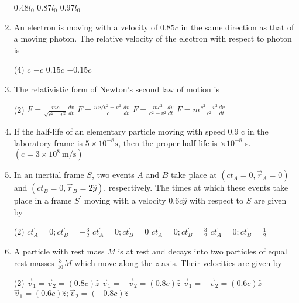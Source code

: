 \begin{enumerate}
\begin{tasks}
	\task[\textbf{B.}]$0.48 l_{0}$
	\task[\textbf{C.}]$0.87 l_{0}$
	\task[\textbf{D.}]$0.97 l_{0}$
\end{tasks}
	\item An electron is moving with a velocity of $0.85 c$ in the same direction as that of a moving photon. The relative velocity of the electron with respect to photon is
	{}
\begin{tasks}(4)
	\task[\textbf{A.}] $c$
	\task[\textbf{B.}]$-c$
	\task[\textbf{C.}] $0.15 c$
	\task[\textbf{D.}]$-0.15 c$
\end{tasks}
	\item  The relativistic form of Newton's second law of motion is 
	{}
\begin{tasks}(2)
	\task[\textbf{A.}] $F=\frac{m c}{\sqrt{c^{2}-v^{2}}} \frac{d v}{d t}$ 
	\task[\textbf{B.}]$F=\frac{m \sqrt{c^{2}-v^{2}}}{c} \frac{d v}{d t}$
	\task[\textbf{C.}]$F=\frac{m c^{2}}{c^{2}-v^{2}} \frac{d v}{d t}$
	\task[\textbf{D.}]$F=m \frac{c^{2}-v^{2}}{c^{2}} \frac{d v}{d t}$
\end{tasks}

	\item If the half-life of an elementary particle moving with speed $0.9$ c in the laboratory frame is $5 \times 10^{-8} s$, then the proper half-life is $\times 10^{-8}$ s. $\left(c=3 \times 10^{8} \mathrm{~m} / \mathrm{s}\right)$
	{}
	\item In an inertial frame $S$, two events $A$ and $B$ take place at $\left(c t_{A}=0, \vec{r}_{A}=0\right)$ and $\left(c t_{B}=0, \vec{r}_{B}=2 \hat{y}\right)$, respectively. The times at which these events take place in a frame $S^{\prime}$ moving with a velocity $0.6 c \hat{y}$ with respect to $S$ are given by
	{}

\begin{tasks}(2)
	\task[\textbf{A.}] $c t_{A}^{\prime}=0 ; c t_{B}^{\prime}=-\frac{3}{2}$
	\task[\textbf{B.}]$c t_{A}^{\prime}=0 ; c t_{B}^{\prime}=0$
	\task[\textbf{C.}]$c t_{A}^{\prime}=0 ; c t_{B}^{\prime}=\frac{3}{2}$
	\task[\textbf{D.}] $c t_{A}^{\prime}=0 ; c t_{B}^{\prime}=\frac{1}{2}$
\end{tasks}

	\item A particle with rest mass $M$ is at rest and decays into two particles of equal rest masses $\frac{3}{10} M$ which move along the $z$ axis. Their velocities are given by
	{}
\begin{tasks}(2)
	\task[\textbf{A.}] $\vec{v}_{1}=\vec{v}_{2}=(0.8 c) \hat{z}$
	\task[\textbf{B.}]$\vec{v}_{1}=-\vec{v}_{2}=(0.8 c) \hat{z}$
	\task[\textbf{C.}]$\vec{v}_{1}=-\vec{v}_{2}=(0.6 c) \hat{z}$
	\task[\textbf{D.}]$\vec{v}_{1}=(0.6 c) \hat{z} ; \vec{v}_{2}=(-0.8 c) \hat{z}$
\end{tasks}


\end{enumerate}
